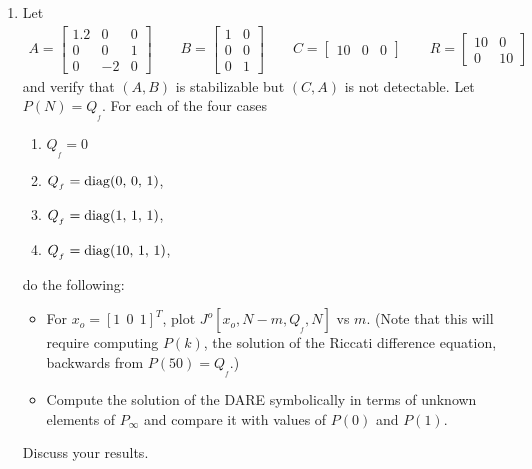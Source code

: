\documentclass[letterpaper,12pt]{article}
\begin{document}
\begin{enumerate}
\begin{enumerate}
\item
\label{case:a}
Let
\begin{align*}
    A = \begin{bmatrix}
            1.2  & 0 & 0 \\
            0 & 0 & 1 \\
            0 & -2 & 0
        \end{bmatrix} \hspace{2em}
        B = \begin{bmatrix}
            1 & 0 \\
            0 & 0 \\
            0 & 1 \end{bmatrix} \hspace{2em}
        C = \begin{bmatrix}
            10 & 0 & 0
        \end{bmatrix} \hspace{2em} R = \begin{bmatrix}
            10 & 0 \\
            0 & 10
        \end{bmatrix}
\end{align*}
and verify that $(A,B)$ is stabilizable but $(C,A)$ is not detectable. Let $P(N) = Q_{_f}$. For each of the four cases
\begin{enumerate}
    \item $Q_{_f} = 0$
    \item $Q_{_f} = {\rm diag}(0,\,0,\,1)$,
    \item $Q_{_f} = {\rm diag}(1,\,1,\,1)$,
    \item $Q_{_f} = {\rm diag}(10,\,1,\,1)$,
\end{enumerate}
do the following:

\begin{itemize}
    \item
    For $x_o = [1 \ \ 0 \ \ 1]^T$, plot $J^o[x_o, N - m, Q_{_f}, N] $  vs $m$. (Note that this will require computing $P(k)$, the solution of the Riccati difference equation, backwards from $P(50) = Q_{_f}$.)

    \item
    Compute the solution of the DARE %
symbolically in terms of unknown elements of $P_\infty$
and compare it with values of $P(0)$ and $P(1)$.

\end{itemize}
Discuss your results.



\end{enumerate}
\end{enumerate}
\end{document}
